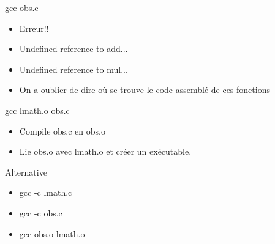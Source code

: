\begin{frame}[containsverbatim]{\ftitle}

\def\blocktitle{gcc obs.c}
\begin{block}{\blocktitle}
\begin{itemize}
\item Erreur!!
\item Undefined reference to add...
\item Undefined reference to mul...
\item On a oublier de dire où se trouve le code assemblé de ces fonctions
\end{itemize}
\end{block}
\def\blocktitle{gcc lmath.o obs.c}
\begin{block}{\blocktitle}
\begin{itemize}
\item Compile obs.c en obs.o
\item Lie obs.o avec lmath.o et créer un exécutable.
\end{itemize}
\end{block}
\end{frame}


\begin{frame}[containsverbatim]{\ftitle}
\def\blocktitle{Alternative}
\begin{block}{\blocktitle}
\begin{itemize}
\item gcc -c lmath.c
\item gcc -c obs.c
\item gcc obs.o lmath.o
\end{itemize}
\end{block}
\end{frame}


